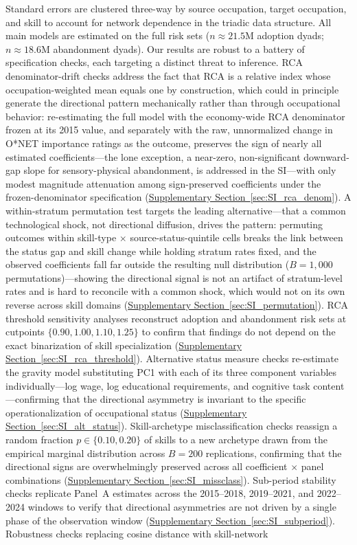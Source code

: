 \documentclass[11pt, letterpaper]{article} %
\begin{document}
Standard errors are clustered three-way by source occupation, target occupation, and skill to account for network dependence in the triadic data structure. All main models are estimated on the full risk sets ($n \approx 21.5$M adoption dyads; $n \approx 18.6$M abandonment dyads). Our results are robust to a battery of specification checks, each targeting a distinct threat to inference. RCA denominator-drift checks address the fact that RCA is a relative index whose occupation-weighted mean equals one by construction, which could in principle generate the directional pattern mechanically rather than through occupational behavior: re-estimating the full model with the economy-wide RCA denominator frozen at its 2015 value, and separately with the raw, unnormalized change in O*NET importance ratings as the outcome, preserves the sign of nearly all estimated coefficients---the lone exception, a near-zero, non-significant downward-gap slope for sensory-physical abandonment, is addressed in the SI---with only modest magnitude attenuation among sign-preserved coefficients under the frozen-denominator specification (\hyperref[sec:SI_rca_denom]{Supplementary Section~\ref*{sec:SI_rca_denom}}). A within-stratum permutation test targets the leading alternative---that a common technological shock, not directional diffusion, drives the pattern: permuting outcomes within skill-type $\times$ source-status-quintile cells breaks the link between the status gap and skill change while holding stratum rates fixed, and the observed coefficients fall far outside the resulting null distribution ($B = 1{,}000$ permutations)---showing the directional signal is not an artifact of stratum-level rates and is hard to reconcile with a common shock, which would not on its own reverse across skill domains (\hyperref[sec:SI_permutation]{Supplementary Section~\ref*{sec:SI_permutation}}). RCA threshold sensitivity analyses reconstruct adoption and abandonment risk sets at cutpoints $\{0.90, 1.00, 1.10, 1.25\}$ to confirm that findings do not depend on the exact binarization of skill specialization (\hyperref[sec:SI_rca_threshold]{Supplementary Section~\ref*{sec:SI_rca_threshold}}). Alternative status measure checks re-estimate the gravity model substituting PC1 with each of its three component variables individually---log wage, log educational requirements, and cognitive task content---confirming that the directional asymmetry is invariant to the specific operationalization of occupational status (\hyperref[sec:SI_alt_status]{Supplementary Section~\ref*{sec:SI_alt_status}}). Skill-archetype misclassification checks reassign a random fraction $p \in \{0.10, 0.20\}$ of skills to a new archetype drawn from the empirical marginal distribution across $B = 200$ replications, confirming that the directional signs are overwhelmingly preserved across all coefficient $\times$ panel combinations (\hyperref[sec:SI_missclass]{Supplementary Section~\ref*{sec:SI_missclass}}). Sub-period stability checks replicate Panel~A estimates across the 2015--2018, 2019--2021, and 2022--2024 windows to verify that directional asymmetries are not driven by a single phase of the observation window (\hyperref[sec:SI_subperiod]{Supplementary Section~\ref*{sec:SI_subperiod}}). Robustness checks replacing cosine distance with skill-network 
\end{document}
